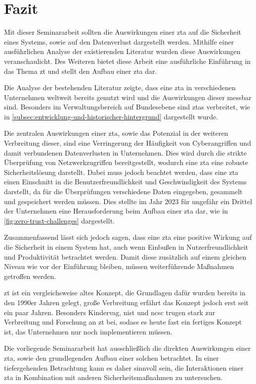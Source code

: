 \newpage
\section{Fazit}\label{sec:fazit}

Mit dieser Seminararbeit sollten die Auswirkungen einer \ac{zta} auf die Sicherheit eines Systems, sowie auf den Datenverlust dargestellt werden.
Mithilfe einer ausführlichen Analyse der existierenden Literatur wurden diese Auswirkungen veranschaulicht.
Des Weiteren bietet diese Arbeit eine ausführliche Einführung in das Thema \ac{zt} und stellt den Aufbau einer \ac{zta} dar.

Die Analyse der bestehenden Literatur zeigte, dass eine \ac{zta} in verschiedenen Unternehmen weltweit bereits genutzt wird und die Auswirkungen dieser messbar sind.
Besonders im Verwaltungsbereich auf Bundesebene sind \acp{zta} verbreitet, wie in \autoref{subsec:entwicklung-und-historischer-hintergrund} dargestellt wurde.

Die zentralen Auswirkungen einer \ac{zta}, sowie das Potenzial in der weiteren Verbreitung dieser, sind eine Verringerung der Häufigkeit von Cyberangriffen und damit verbundenen Datenverlusten in Unternehmen.
Dies wird durch die strikte Überprüfung von Netzwerkzugriffen bereitgestellt, wodurch eine \ac{zta} eine robuste Sicherheitslösung darstellt.
Dabei muss jedoch beachtet werden, dass eine \ac{zta} einen Einschnitt in die Benutzerfreundlichkeit und Geschwindigkeit des Systems darstellt, da für die Überprüfungen verschiedene Daten eingegeben, gesammelt und gespeichert werden müssen.
Dies stellte im Jahr 2023 für ungefähr ein Drittel der Unternehmen eine Herausforderung beim Aufbau einer \ac{zta} dar, wie in \autoref{fig:zero-trust-challenges} dargestellt.

Zusammenfassend lässt sich jedoch sagen, dass eine \ac{zta} eine positive Wirkung auf die Sicherheit in einem System hat, auch wenn Einbußen in Nutzerfreundlichkeit und Produktivität betrachtet werden.
Damit diese zusätzlich auf einem gleichen Niveau wie vor der Einführung bleiben, müssen weiterführende Maßnahmen getroffen werden.

\ac{zt} ist ein vergleichsweise altes Konzept, die Grundlagen dafür wurden bereits in den 1990er Jahren gelegt, große Verbreitung erfährt das Konzept jedoch erst seit ein paar Jahren.
Besonders Kindervag, \ac{nist} und \ac{ncsc} trugen stark zur Verbreitung und Forschung an \ac{zt} bei, sodass es heute fast ein fertiges Konzept ist, das Unternehmen nur noch implementieren müssen.\autocites{kindervag-2010}{NIST:800207}{ncsc-2021}

Die vorliegende Seminararbeit hat ausschließlich die direkten Auswirkungen einer \ac{zta}, sowie den grundlegenden Aufbau einer solchen betrachtet.
In einer tiefergehenden Betrachtung kann es daher sinnvoll sein, die Interaktionen einer \ac{zta} in Kombination mit anderen Sicherheitsmaßnahmen zu untersuchen.